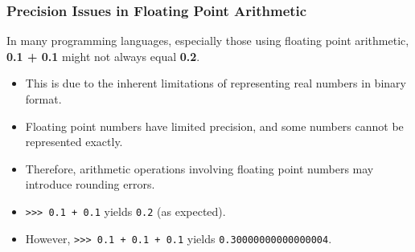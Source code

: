 \documentclass{beamer}
\begin{document}
\begin{frame}
  \frametitle{Precision Issues in Floating Point Arithmetic}
  
  In many programming languages, especially those using floating point arithmetic, \textbf{0.1 + 0.1} might not always equal \textbf{0.2}.
  
  \begin{itemize}
    \item This is due to the inherent limitations of representing real numbers in binary format.
    \item Floating point numbers have limited precision, and some numbers cannot be represented exactly.
    \item Therefore, arithmetic operations involving floating point numbers may introduce rounding errors.
  \end{itemize}
\end{frame}
\begin{frame}
  
  \begin{itemize}
    \item \texttt{>>> 0.1 + 0.1} yields \texttt{0.2} (as expected).
    \item However, \texttt{>>> 0.1 + 0.1 + 0.1} yields \texttt{0.30000000000000004}.
  \end{itemize}
\end{frame}
  
\end{document}
